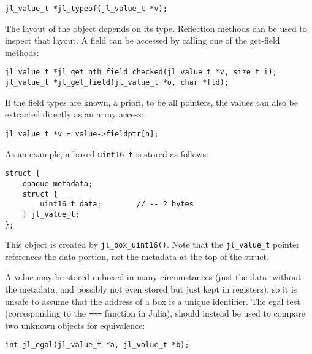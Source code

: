 \begin{lstlisting}
jl_value_t *jl_typeof(jl_value_t *v);
\end{lstlisting}



The layout of the object depends on its type. Reflection methods can be used to inspect that layout. A field can be accessed by calling one of the get-field methods:




\begin{lstlisting}
jl_value_t *jl_get_nth_field_checked(jl_value_t *v, size_t i);
jl_value_t *jl_get_field(jl_value_t *o, char *fld);
\end{lstlisting}



If the field types are known, a priori, to be all pointers, the values can also be extracted directly as an array access:




\begin{lstlisting}
jl_value_t *v = value->fieldptr[n];
\end{lstlisting}



As an example, a {\textquotedbl}boxed{\textquotedbl} \texttt{uint16\_t} is stored as follows:




\begin{lstlisting}
struct {
    opaque metadata;
    struct {
        uint16_t data;        // -- 2 bytes
    } jl_value_t;
};
\end{lstlisting}



This object is created by \texttt{jl\_box\_uint16()}. Note that the \texttt{jl\_value\_t} pointer references the data portion, not the metadata at the top of the struct.



A value may be stored {\textquotedbl}unboxed{\textquotedbl} in many circumstances (just the data, without the metadata, and possibly not even stored but just kept in registers), so it is unsafe to assume that the address of a box is a unique identifier. The {\textquotedbl}egal{\textquotedbl} test (corresponding to the \texttt{===} function in Julia), should instead be used to compare two unknown objects for equivalence:




\begin{lstlisting}
int jl_egal(jl_value_t *a, jl_value_t *b);
\end{lstlisting}



